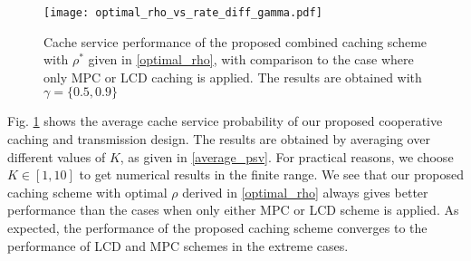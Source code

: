 \documentclass[twocolumns,10pt]{IEEEtran}
\begin{document}
\begin{figure}
	\centering
	\texttt{[image: optimal\_rho\_vs\_rate\_diff\_gamma.pdf]}
	\caption{Cache service performance of the proposed combined caching scheme with $\rho^{*}$ given in \eqref{optimal_rho}, with comparison to the case where only MPC or LCD caching is applied. The results are obtained with $\gamma=\{0.5, 0.9\}$ }
	\label{optimal_rho_K3_R100}
\end{figure}

Fig. \ref{optimal_rho_K3_R100} shows the average cache service probability of our proposed cooperative caching and transmission design. The results are obtained by averaging over different values of $K$, as given in \eqref{average_psv}. For practical reasons, we choose $K\in[1,10]$ to get numerical results in the finite range. We see that our proposed caching scheme with optimal $\rho$ derived in \eqref{optimal_rho} always gives better performance than the cases when only either MPC or LCD scheme is applied. As expected, the performance of the proposed caching scheme converges to the performance of LCD and MPC schemes in the extreme cases. 
\end{document}
